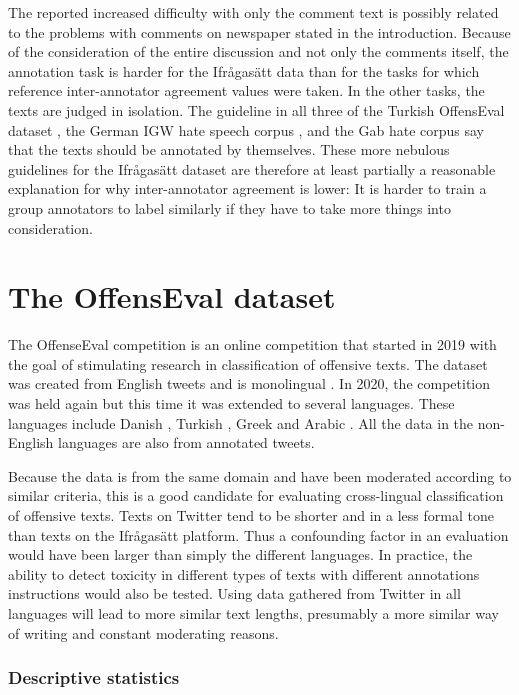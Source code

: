 \documentclass[nofilelist]{cslthse-msc}
\begin{document}
The reported increased difficulty with only the comment text is possibly related to the problems with comments on newspaper stated in the introduction. Because of the consideration of the entire discussion and not only the comments itself, the annotation task is harder for the Ifrågasätt data than for the tasks for which reference inter-annotator agreement values were taken. In the other tasks, the texts are judged in isolation. The guideline in all three of the Turkish OffensEval dataset \citep{turkoffensive}, the German IGW hate speech corpus \citep{DBLP:journals/corr/RossRCCKW17}, and the Gab hate corpus \citep{kennedy_atari} say that the texts should be annotated by themselves. These more nebulous guidelines for the Ifrågasätt dataset are therefore at least partially a reasonable explanation for why inter-annotator agreement is lower: It is harder to train a group annotators to label similarly if they have to take more things into consideration.

\section{The OffensEval dataset}

The OffenseEval competition is an online competition that started in 2019 with the goal of stimulating research in classification of offensive texts. The dataset was created from English tweets and is monolingual \citep{zampieri2019semeval}. In 2020, the competition was held again but this time it was extended to several languages. These languages include  Danish \citep{danishoffensive}, Turkish \citep{turkoffensive}, Greek \citep{greekoffensive} and Arabic \citep{araboffensive}. All the data in the non-English languages are also from annotated tweets.

Because the data is from the same domain and have been moderated according to similar criteria, this is a good candidate for evaluating cross-lingual classification of offensive texts. Texts on Twitter tend to be shorter and in a less formal tone than texts on the Ifrågasätt platform. Thus a confounding factor in an evaluation would have been larger than simply the different languages. In practice, the ability to detect toxicity in different types of texts with different annotations instructions would also be tested. Using data gathered from Twitter in all languages will lead to more similar text lengths, presumably a more similar way of writing and constant moderating reasons.

\subsubsection{Descriptive statistics}
\end{document}
